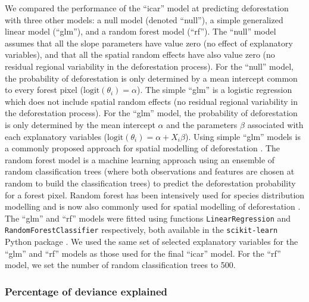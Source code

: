 \documentclass[
  12pt,
]{article}
\begin{document}
We compared the performance of the ``icar'' model at predicting deforestation with three other models: a null model (denoted ``null''), a simple generalized linear model (``glm''), and a random forest model (``rf''). The ``null'' model assumes that all the slope parameters have value zero (no effect of explanatory variables), and that all the spatial random effects have also value zero (no residual regional variability in the deforestation process). For the ``null'' model, the probability of deforestation is only determined by a mean intercept common to every forest pixel (\(\text{logit}(\theta_i) = \alpha\)). The simple ``glm'' is a logistic regression which does not include spatial random effects (no residual regional variability in the deforestation process). For the ``glm'' model, the probability of deforestation is only determined by the mean intercept \(\alpha\) and the parameters \(\beta\) associated with each explanatory variables (\(\text{logit}(\theta_i) = \alpha + X_i \beta\)). Using simple ``glm'' models is a commonly proposed approach for spatial modelling of deforestation \citep{Mas2007, Rosa2014, Ludeke1990, Soares-Filho2002}. The random forest model \citep{Breiman2001} is a machine learning approach using an ensemble of random classification trees (where both observations and features are chosen at random to build the classification trees) to predict the deforestation probability for a forest pixel. Random forest has been intensively used for species distribution modelling \citep{Thuiller2009} and is now also commonly used for spatial modelling of deforestation \citep{Grinand2020, Zanella2017}. The ``glm'' and ``rf'' models were fitted using functions \texttt{LinearRegression} and \texttt{RandomForestClassifier} respectively, both available in the \texttt{scikit-learn} Python package \citep{Pedregosa2011}. We used the same set of selected explanatory variables for the ``glm'' and ``rf'' models as those used for the final ``icar'' model. For the ``rf'' model, we set the number of random classification trees to 500.

\hypertarget{percentage-of-deviance-explained}{%
\subsubsection{Percentage of deviance explained}\label{percentage-of-deviance-explained}}
\end{document}
